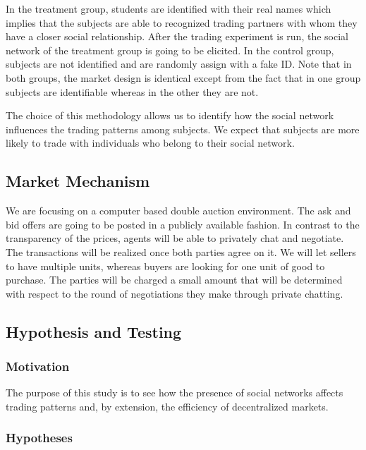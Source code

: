 \documentclass{article}
\begin{document}
In the treatment group, students are identified with their real names which
implies that the subjects are able to recognized trading partners with whom they
have a closer social relationship. After the trading experiment is run, the
social network of the treatment group is going to be elicited. In the control
group, subjects are not identified and are randomly assign with a fake ID. Note
that in both groups, the market design is identical except from the fact that in
one group subjects are identifiable whereas in the other they are not.

The choice of this methodology allows us to identify how the social network
influences the trading patterns among subjects. We expect that subjects are more
likely to trade with individuals who belong to their social network.

\subsection{Market Mechanism}

We are focusing on a computer based double auction environment. The ask and bid offers are going to be posted in a publicly available fashion. In contrast to the transparency of the prices, agents will be able to privately chat and negotiate. The transactions will be realized once both parties agree on it. We will let sellers to have multiple units, whereas buyers are looking for one unit of good to purchase. The parties will be charged a small amount that will be determined with respect to the round of negotiations they make through private chatting. 

\subsection{Hypothesis and Testing}
\subsubsection{Motivation}

The purpose of this study is to see how the presence of social networks affects
trading patterns and, by extension, the efficiency of decentralized markets.

\subsubsection{Hypotheses}
\end{document}
